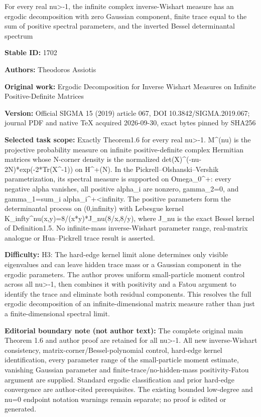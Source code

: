 \documentclass[11pt]{article}
\numberwithin{equation}{section}
\begin{document}
\begin{center}\Large For every real nu>-1, the infinite complex inverse-Wishart measure has an ergodic decomposition with zero Gaussian component, finite trace equal to the sum of positive spectral parameters, and the inverted Bessel determinantal spectrum\end{center}
\noindent\textbf{Stable ID:} 1702\par
\noindent\textbf{Authors:} Theodoros Assiotis\par
\noindent\textbf{Original work:} Ergodic Decomposition for Inverse Wishart Measures on Infinite Positive-Definite Matrices\par
\noindent\textbf{Version:} Official SIGMA 15 (2019) article 067, DOI 10.3842/SIGMA.2019.067; journal PDF and native TeX acquired 2026-09-30, exact bytes pinned by SHA256\par
\noindent\textbf{Selected task scope:} Exactly Theorem1.6 for every real nu>-1. M\textasciicircum{}(nu) is the projective probability measure on infinite positive-definite complex Hermitian matrices whose N-corner density is the normalized det(X)\textasciicircum{}(-nu-2N)*exp(-2*Tr(X\textasciicircum{}-1)) on H\textasciicircum{}+(N). In the Pickrell–Olshanski–Vershik parametrization, its spectral measure is supported on Omega\_0\textasciicircum{}+: every negative alpha vanishes, all positive alpha\_i are nonzero, gamma\_2=0, and gamma\_1=sum\_i alpha\_i\textasciicircum{}+<infinity. The positive parameters form the determinantal process on (0,infinity) with Lebesgue kernel K\_infty\textasciicircum{}nu(x,y)=8/(x*y)*J\_nu(8/x,8/y), where J\_nu is the exact Bessel kernel of Definition1.5. No infinite-mass inverse-Wishart parameter range, real-matrix analogue or Hua–Pickrell trace result is asserted.\par
\noindent\textbf{Difficulty:} H3: The hard-edge kernel limit alone determines only visible eigenvalues and can leave hidden trace mass or a Gaussian component in the ergodic parameters. The author proves uniform small-particle moment control across all nu>-1, then combines it with positivity and a Fatou argument to identify the trace and eliminate both residual components. This resolves the full ergodic decomposition of an infinite-dimensional matrix measure rather than just a finite-dimensional spectral limit.\par
\noindent\textbf{Editorial boundary note (not author text):} The complete original main Theorem 1.6 and author proof are retained for all nu>-1. All new inverse-Wishart consistency, matrix-corner/Bessel-polynomial control, hard-edge kernel identification, every parameter range of the small-particle moment estimate, vanishing Gaussian parameter and finite-trace/no-hidden-mass positivity-Fatou argument are supplied. Standard ergodic classification and prior hard-edge convergence are author-cited prerequisites. The existing bounded low-degree and nu=0 endpoint notation warnings remain separate; no proof is edited or generated.\par
\end{document}
